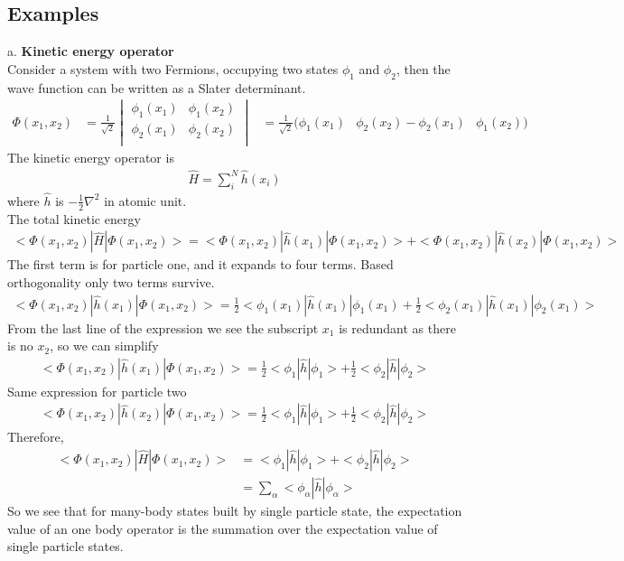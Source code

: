 \documentclass[a4paper]{article}
\begin{document}
\subsection{Examples}
a. {\bf Kinetic energy operator}\\
Consider a system with two Fermions, occupying two states $\phi_{1}$ and $\phi_{2}$, then the wave function can be written as a Slater determinant.
\begin{align*}
	\Phi(x_1, x_2)
	& =\frac{1}{\sqrt{2}}
	\begin{vmatrix}
		\phi_{1}(x_1) & \phi_{1} (x_2) \\ 
		\phi_{2}(x_1)  & \phi_{2} (x_2)  \\ 
	\end{vmatrix}
	& = \frac{1}{\sqrt{2}} (\phi_{1}(x_1) & \phi_{2} (x_2) -
		\phi_{2}(x_1)  & \phi_{1} (x_2))
\end{align*}
The kinetic energy operator is 
\begin{align*}
	\hat H = \sum_i^N \hat h(x_i)
\end{align*}
where $\hat h$ is $-\frac{1}{2}\nabla^2$ in atomic unit.\\
The total kinetic energy\\
\begin{align*}
	<\Phi(x_1,x_2)| \hat H | \Phi(x_1, x_2)> 
	= <\Phi(x_1,x_2)| \hat h(x_1) | \Phi(x_1, x_2)>  + <\Phi(x_1,x_2)| \hat h(x_2) | \Phi(x_1, x_2)>
\end{align*}
The first term is for particle one, and it expands to four terms. Based orthogonality only two terms survive.
\begin{align*}
	<\Phi(x_1,x_2)| \hat h(x_1) | \Phi(x_1, x_2)> 
	= \frac{1}{2} <\phi_{1}(x_1) | \hat h(x_1)| \phi_{1} (x_1) + \frac{1}{2} <\phi_{2}(x_1) | \hat h(x_1)| \phi_{2} (x_1)>	
\end{align*}
From the last line of the expression we see the subscript $x_1$ is redundant as there is no $x_2$, so we can simplify\\
\begin{align*}
	<\Phi(x_1,x_2)| \hat h(x_1) | \Phi(x_1, x_2)>
	= \frac{1}{2} <\phi_{1}|\hat h|\phi_{1}> + \frac{1}{2} <\phi_{2} | \hat h| \phi_{2}>	
\end{align*}
Same expression for particle two
\begin{align*}
	<\Phi(x_1,x_2)| \hat h(x_2) | \Phi(x_1, x_2)>
	= \frac{1}{2} <\phi_{1}|\hat h|\phi_{1}> + \frac{1}{2} <\phi_{2} | \hat h| \phi_{2}>	
\end{align*}
Therefore,
\begin{align*}
	<\Phi(x_1,x_2)| \hat H | \Phi(x_1, x_2)>  
	& =  <\phi_{1}|\hat h|\phi_{1}> +  <\phi_{2} | \hat h|\phi_{2}> \\
	& = \sum_{\alpha}<\phi_{\alpha}|\hat h|\phi_{\alpha}> 
\end{align*}
So we see that for many-body states built by single particle state, the expectation value of an one body operator is the summation over the expectation value of single particle states.\\
\end{document}

